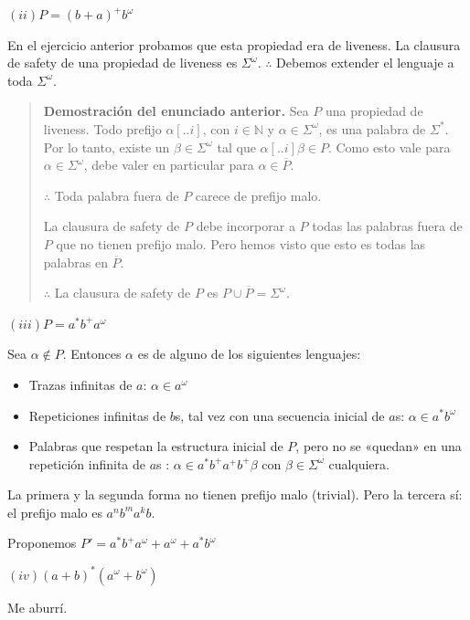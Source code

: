 \documentclass[a4paper, 12pt]{article}
\begin{document}
$(i i) P = (b+a)^+ b^\omega$

En el ejercicio anterior probamos que esta propiedad era de liveness. La
clausura de safety de una propiedad de liveness es $\Sigma^\omega$. $\therefore
$ Debemos extender el lenguaje a toda $\Sigma^\omega$.


\small
\begin{quote}

\textbf{Demostración del enunciado anterior.} Sea $P$ una propiedad de liveness.
Todo prefijo $\alpha[..i]$, con $i \in \mathbb{N}$ y $\alpha \in \Sigma^\omega$,
es una palabra de $\Sigma^*$. Por lo tanto, existe un $\beta \in \Sigma^\omega$
tal que $\alpha[..i]\beta \in P$. Como esto vale para $\alpha \in
\Sigma^\omega$, debe valer en particular para $\alpha \in \overline{P}$. 

$\therefore $ Toda palabra fuera de $P$ carece de prefijo malo.

La clausura de safety de $P$ debe incorporar a $P$ todas las palabras
fuera de $P$ que no tienen prefijo malo. Pero hemos visto que esto es todas las
palabras en $\overline{P}$. 

$\therefore $ La clausura de safety de $P$ es $P \cup \overline{P} =
\Sigma^\omega$.


\end{quote}
\normalsize


$(i i i) P = a^*b^+ a^\omega$

Sea $\alpha \not\in P$. Entonces $\alpha$ es de alguno de los siguientes
lenguajes:

\begin{itemize}
    \item Trazas infinitas de $a$:  $\alpha \in  a^\omega$
    \item Repeticiones infinitas de $b$s, tal vez con una secuencia inicial de
        $a$s: $\alpha \in  a^* b^\omega$
    \item Palabras que respetan la estructura inicial de $P$, pero no se
        «quedan» en una repetición infinita de $a$s : $\alpha \in  a^* b^+ a^+ b^+\beta$ con $\beta \in \Sigma^\omega$
        cualquiera.
\end{itemize}

La primera y la segunda forma no tienen prefijo malo (trivial). Pero la tercera
sí: el prefijo malo es $a^nb^ma^kb$. 

Proponemos $P' = a^* b^+ a^\omega + a^\omega + a^*b^\omega$


$(iv) (a+b)^*(a^\omega + b^\omega)$

Me aburrí.
\end{document}
